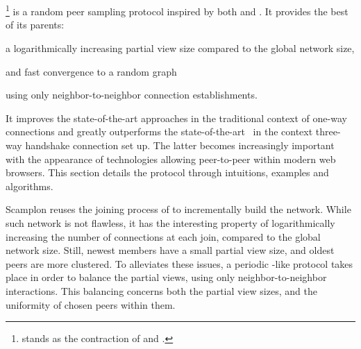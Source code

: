 
\section{\SCAMPLON{}}
\label{sec:proposal}

\SCAMPLON{}\footnote{\SCAMPLON{} stands as the contraction of \SCAMP{} and
  \CYCLON{}.} is a random peer sampling protocol inspired by both \SCAMP{} and
\CYCLON{}. It provides the best of its parents: 
\begin{inparaenum}[(i)]
\item a logarithmically increasing partial view size compared to the global
  network size,
\item and fast convergence to a random graph
\item using only neighbor-to-neighbor connection establishments.
\end{inparaenum}
It improves the state-of-the-art approaches in the traditional context of
one-way connections and greatly outperforms the
state-of-the-art~\cite{ganesh2001scamp,voulgaris2005cyclon} in the context
three-way handshake connection set up.  The latter becomes increasingly
important with the appearance of technologies allowing peer-to-peer within
modern web browsers. This section details the \SCAMPLON{} protocol through
intuitions, examples and algorithms.

\begin{asparadesc}
\item [Scamplon] reuses the joining process of \SCAMP{} to incrementally build
  the network. While such network is not flawless, it has the interesting
  property of logarithmically increasing the number of connections at each
  join, compared to the global network size. Still, newest members have a small
  partial view size, and oldest peers are more clustered. To alleviates these
  issues, a periodic \CYCLON{}-like protocol takes place in order to balance
  the partial views, using only neighbor-to-neighbor interactions. This
  balancing concerns both the partial view sizes, and the uniformity of chosen
  peers within them.
\end{asparadesc}

